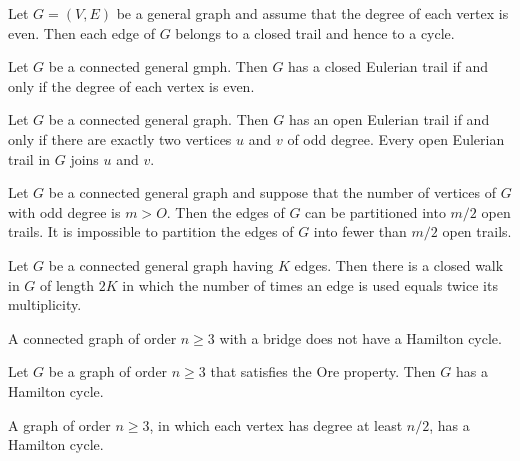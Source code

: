 \begin{theorem}
  \label{thm:11.2.1}
  Let $G = (V, E)$ be a general graph and assume that the degree of each vertex is even. Then each 
  edge of $G$ belongs to a closed trail and hence to a cycle.
\end{theorem}

\begin{theorem}
  \label{thm:11.2.2}
  Let $G$ be a connected general gmph. Then $G$ has a closed Eulerian trail if and only if the 
  degree of each vertex is even.
\end{theorem}

\begin{theorem}
  \label{thm:11.2.3}
  Let $G$ be a connected general graph. Then $G$ has an open Eulerian trail if and only if there are
  exactly two vertices $u$ and $v$ of odd degree. Every open Eulerian trail in $G$ joins $u$ and $v$.
\end{theorem}

\begin{theorem}
  \label{thm:11.2.4}
  Let $G$ be a connected general graph and suppose that the number of vertices of $G$ with odd 
  degree is $m > O$. Then the edges of $G$ can be partitioned into $m/2$ open trails. It is 
  impossible to partition the edges of $G$ into fewer than $m/2$ open trails.
\end{theorem}

\begin{theorem}
  \label{thm:11.2.5}
  Let $G$ be a connected general graph having $K$ edges. Then there is a closed walk in $G$ of 
  length $2K$ in which the number of times an edge is used equals twice its multiplicity.
\end{theorem}

\begin{theorem}
  \label{thm:11.3.1}
  A connected graph of order $n \geq 3$ with a bridge does not have a Hamilton cycle.
\end{theorem}

\begin{theorem}
  \label{thm:11.3.2}
  Let $G$ be a graph of order $n \geq 3$ that satisfies the Ore property. Then $G$ has a Hamilton 
  cycle.
\end{theorem}

\begin{corollary}
  \label{cor:11.3.3}
  A graph of order $n \geq 3$, in which each vertex has degree at least $n/2$, has a Hamilton cycle.

\end{corollary}

